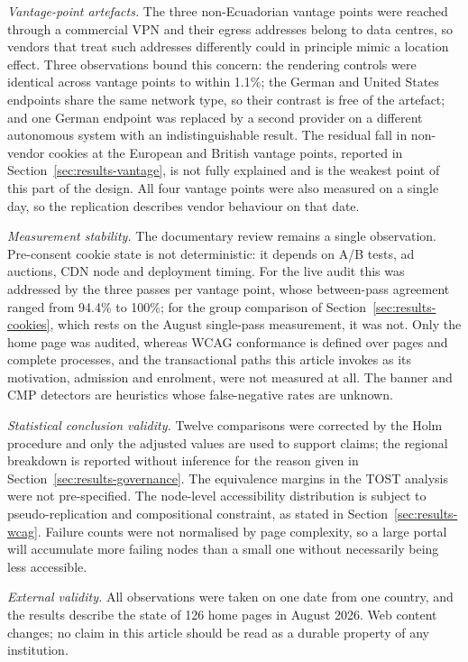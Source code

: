 \documentclass[pdflatex,sn-basic,Numbered]{sn-jnl}
\theoremstyle{thmstyleone}
\theoremstyle{thmstyletwo}
\theoremstyle{thmstylethree}
\begin{document}
\emph{Vantage-point artefacts.} The three non-Ecuadorian vantage points were reached through a commercial VPN and their egress addresses belong to data centres, so vendors that treat such addresses differently could in principle mimic a location effect. Three observations bound this concern: the rendering controls were identical across vantage points to within 1.1\%; the German and United States endpoints share the same network type, so their contrast is free of the artefact; and one German endpoint was replaced by a second provider on a different autonomous system with an indistinguishable result. The residual fall in non-vendor cookies at the European and British vantage points, reported in Section~\ref{sec:results-vantage}, is not fully explained and is the weakest point of this part of the design. All four vantage points were also measured on a single day, so the replication describes vendor behaviour on that date.

\emph{Measurement stability.} The documentary review remains a single observation. Pre-consent cookie state is not deterministic: it depends on A/B tests, ad auctions, CDN node and deployment timing. For the live audit this was addressed by the three passes per vantage point, whose between-pass agreement ranged from 94.4\% to 100\%; for the group comparison of Section~\ref{sec:results-cookies}, which rests on the August single-pass measurement, it was not. Only the home page was audited, whereas WCAG conformance is defined over pages and complete processes, and the transactional paths this article invokes as its motivation, admission and enrolment, were not measured at all. The banner and CMP detectors are heuristics whose false-negative rates are unknown.

\emph{Statistical conclusion validity.} Twelve comparisons were corrected by the Holm procedure and only the adjusted values are used to support claims; the regional breakdown is reported without inference for the reason given in Section~\ref{sec:results-governance}. The equivalence margins in the TOST analysis were not pre-specified. The node-level accessibility distribution is subject to pseudo-replication and compositional constraint, as stated in Section~\ref{sec:results-wcag}. Failure counts were not normalised by page complexity, so a large portal will accumulate more failing nodes than a small one without necessarily being less accessible.

\emph{External validity.} All observations were taken on one date from one country, and the results describe the state of 126 home pages in August 2026. Web content changes; no claim in this article should be read as a durable property of any institution.
\end{document}
